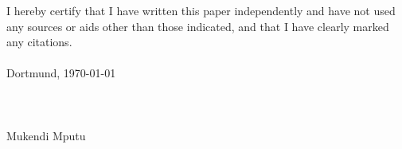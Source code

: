 \cleardoublepage
\normalsize
I hereby certify that I have written this paper independently and have not used any sources or aids other than those indicated, and that I have clearly marked any citations.\\\\
Dortmund, \today \\\\\\\\
Mukendi Mputu
